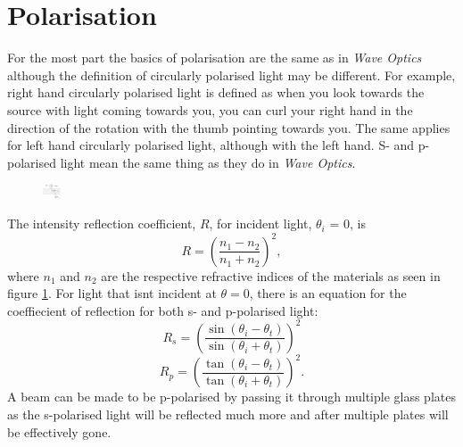 \section{Polarisation}

For the most part the basics of polarisation are the same as in \textit{Wave Optics} although the definition of circularly polarised light may be different.
 For example, right hand circularly polarised light is defined as when you look towards the source with light coming towards you, you can curl your right hand in the direction of the rotation with the thumb pointing towards you. %
 The same applies for left hand circularly polarised light, although with the left hand.
 S- and p-polarised light mean the same thing as they do in \textit{Wave Optics}.
 \\
 \begin{figure}[H]
 	\includegraphics[width=15pt,scale=0.6]{Photonics/pho_polarisation_1}
 	
 	\label{fig:ItP:polarisation1}
 \end{figure}
 The intensity reflection coefficient, $R$, for incident light, $\theta_i$ = 0, is
 \begin{equation}
 R = \left(\frac{n_1-n_2}{n_1+n_2}\right)^2,
 \end{equation}
 where \(n_1\) and \(n_2\) are the respective refractive indices of the materials as seen in figure \ref{fig:ItP:polarisation1}. 
 For light that isnt incident at \(\theta = 0\), there is an equation for the coeffiecient of reflection for both s- and p-polarised light:
 \begin{equation}
 R_s = \left(\frac{\sin(\theta_i - \theta_t)}{\sin(\theta_i + \theta_t)}\right)^2
 \end{equation}
 \begin{equation}
R_p  = \left(\frac{\tan(\theta_i - \theta_t)}{\tan(\theta_i + \theta_t)}\right)^2.
 \end{equation}
A beam can be made to be p-polarised by passing it through multiple glass plates as the s-polarised light will be reflected much more and after multiple plates will be effectively gone.
